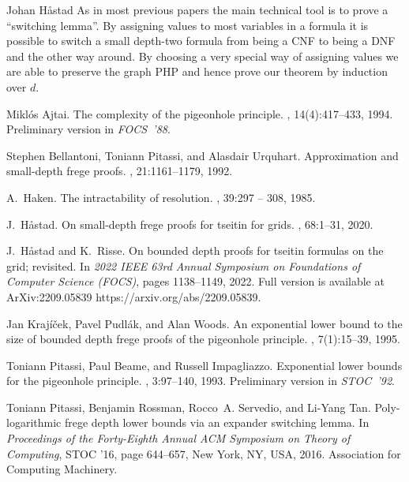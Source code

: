 \documentclass[report]{owrart}
\begin{document}
\begin{report}
\begin{talk}{Johan H\aa stad}
As in most previous papers the main technical tool is to 
prove a ``switching lemma''.
By assigning values to most variables in a formula it is
possible to switch a small depth-two formula from being
a CNF to being a DNF and the other way around.
By choosing a very special way of assigning values we
are able to preserve the graph PHP and hence prove
our theorem by induction over $d$.


    \begin{thebibliography}{99}
    
Mikl\'{o}s Ajtai.
\newblock The complexity of the pigeonhole principle.
, 14(4):417\nobreakdash--433, 1994.
\newblock Preliminary version in \emph{FOCS~'88}.

Stephen Bellantoni, Toniann Pitassi, and Alasdair Urquhart.
\newblock Approximation and small-depth frege proofs.
, 21:1161--1179, 1992.

A.~Haken.
\newblock The intractability of resolution.
, 39:297 -- 308, 1985.

J.~H{\aa{}}stad.
\newblock On small-depth frege proofs for tseitin for grids.
, 68:1--31, 2020.

J.~H{\aa{}}stad and K.~Risse.
\newblock On bounded depth proofs for tseitin formulas on the grid; revisited.
\newblock In {\em 2022 IEEE 63rd Annual Symposium on Foundations of Computer
  Science (FOCS)}, pages 1138--1149, 2022.
\newblock Full version is available at ArXiv:2209.05839
  https://arxiv.org/abs/2209.05839.

Jan Krajíček, Pavel Pudlák, and Alan Woods.
\newblock An exponential lower bound to the size of bounded depth frege proofs
  of the pigeonhole principle.
, 7(1):15--39, 1995.

Toniann Pitassi, Paul Beame, and Russell Impagliazzo.
\newblock Exponential lower bounds for the pigeonhole principle.
, 3:97\nobreakdash--140, 1993.
\newblock Preliminary version in \emph{STOC~'92}.

Toniann Pitassi, Benjamin Rossman, Rocco~A. Servedio, and Li-Yang Tan.
\newblock Poly-logarithmic frege depth lower bounds via an expander switching
  lemma.
\newblock In {\em Proceedings of the Forty-Eighth Annual ACM Symposium on
  Theory of Computing}, STOC ’16, page 644–657, New York, NY, USA, 2016.
  Association for Computing Machinery.


\end{thebibliography}
\end{talk}
\end{report}
\end{document}
